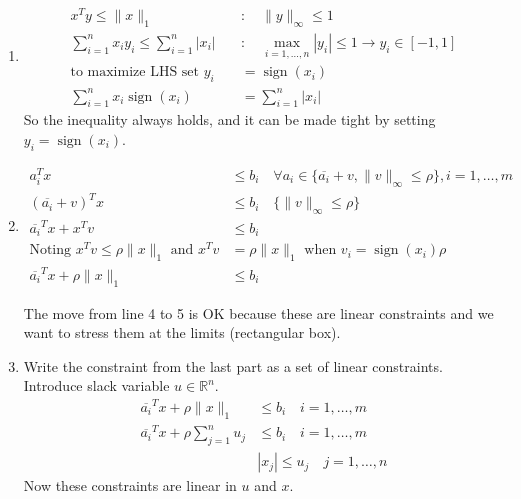\documentclass[11pt]{article}
\DeclareMathOperator*{\sign}{sign}
\begin{document}
\begin{solution}
\begin{enumerate}
    \item
    \begin{align*}
        x^T y \leq \|x\|_1 \quad &: \quad \|y\|_\infty \leq 1 \\
        \sum_{i=1}^n x_i y_i \leq \sum_{i=1}^n |x_i| \quad &: \quad \max_{i=1,\dots,n} |y_i| \leq 1 \rightarrow y_i \in [-1, 1] \\
        \text{to maximize LHS set } y_i &= \sign(x_i) \\
        \sum_{i=1}^n x_i \sign(x_i) &= \sum_{i=1}^n |x_i|
    \end{align*}
    So the inequality always holds, and it can be made tight by setting $y_i = \sign(x_i)$.

    \item
    \begin{align*}
        a_i^T x &\leq b_i \quad \forall a_i \in \{\overline{a_i} + v, \|v\|_\infty \leq \rho\}, i = 1, \dots, m \\
        (\overline{a_i} + v)^T x &\leq b_i \quad \{\|v\|_\infty \leq \rho\} \\
        \overline{a_i}^T x + x^T v &\leq b_i \\
        \text{Noting } x^T v \leq \rho \|x\|_1 \text{ and } x^T v &= \rho \|x\|_1 \text{ when } v_i = \sign(x_i) \rho \\
        \overline{a_i}^T x + \rho \|x\|_1 &\leq b_i
    \end{align*}

    The move from line 4 to 5 is OK because these are linear constraints and we want to stress them at the limits (rectangular box).

    \item Write the constraint from the last part as a set of linear constraints. Introduce slack variable $u \in \mathbb{R}^n$.
    \begin{align*}
        \overline{a_i}^T x + \rho \|x\|_1 &\leq b_i \quad i = 1, \dots, m \\
        \overline{a_i}^T x + \rho \sum_{j=1}^n u_j & \leq b_i \quad i = 1, \dots, m\\
        &|x_j| \leq u_j \quad j = 1, \dots, n
    \end{align*}
    Now these constraints are linear in $u$ and $x$.
\end{enumerate}
\end{solution}
\end{document}
